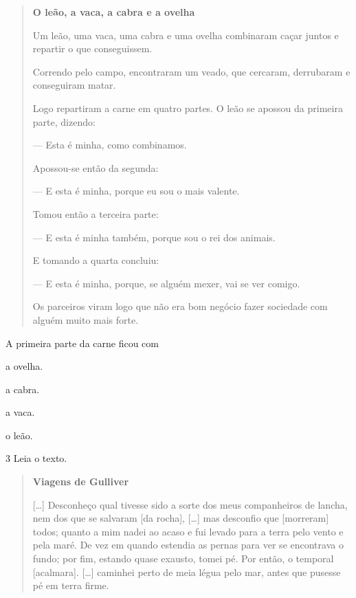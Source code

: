 \begin{quote}
\textbf{O leão, a vaca, a cabra e a ovelha}

Um leão, uma vaca, uma cabra e uma ovelha combinaram
caçar juntos e repartir o que conseguissem.

Correndo pelo campo, encontraram um veado, que
cercaram, derrubaram e conseguiram matar.

Logo repartiram a carne em quatro partes. O leão se
apossou da primeira parte, dizendo:

--- Esta é minha, como combinamos.

Apossou-se então da segunda:

--- E esta é minha, porque eu sou o mais valente.

Tomou então a terceira parte:

--- E esta é minha também, porque sou o rei dos
animais.

E tomando a quarta concluiu:

--- E esta é minha, porque, se alguém mexer, vai se ver
comigo.

Os parceiros viram logo que não era bom negócio fazer
sociedade com alguém muito mais forte.

\end{quote}

A primeira parte da carne ficou com

\begin{escolha}
\item a ovelha.

\item a cabra.

\item a vaca.

\item o leão.
\end{escolha}


\pagebreak
\num{3} Leia o texto.

\begin{quote}
\textbf{Viagens de Gulliver}

{[}\ldots{}{]} Desconheço qual tivesse sido a sorte dos meus
companheiros de lancha, nem dos que se salvaram [da rocha],
{[}\ldots{}{]} mas desconfio que [morreram] todos; quanto a mim nadei ao
acaso e fui levado para a terra pelo vento e pela maré. De vez em quando
estendia as pernas para ver se encontrava o fundo; por fim, estando
quase exausto, tomei pé. Por então, o temporal [acalmara]. {[}\ldots{}{]}
caminhei perto de meia légua pelo mar, antes que pusesse pé em terra
firme.

\end{quote}

